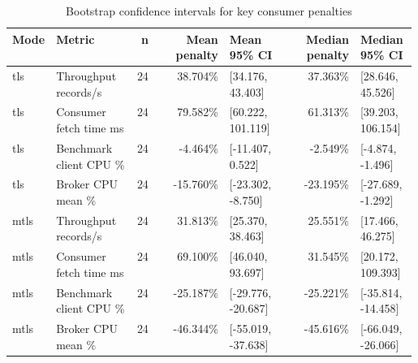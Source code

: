 \begin{table}[H]
\centering
\setlength{\tabcolsep}{4pt}
\renewcommand{\arraystretch}{1.15}
\begin{tabular}{|p{0.10\linewidth}|p{0.20\linewidth}|r|r|p{0.14\linewidth}|r|p{0.14\linewidth}|}
\hline
\textbf{Mode} & \textbf{Metric} & \textbf{n} & \textbf{Mean penalty} & \textbf{Mean 95\% CI} & \textbf{Median penalty} & \textbf{Median 95\% CI} \\
\hline
tls & Throughput records/s & 24 & 38.704\% & [34.176, 43.403] & 37.363\% & [28.646, 45.526] \\
tls & Consumer fetch time ms & 24 & 79.582\% & [60.222, 101.119] & 61.313\% & [39.203, 106.154] \\
tls & Benchmark client CPU \% & 24 & -4.464\% & [-11.407, 0.522] & -2.549\% & [-4.874, -1.496] \\
tls & Broker CPU mean \% & 24 & -15.760\% & [-23.302, -8.750] & -23.195\% & [-27.689, -1.292] \\
mtls & Throughput records/s & 24 & 31.813\% & [25.370, 38.463] & 25.551\% & [17.466, 46.275] \\
mtls & Consumer fetch time ms & 24 & 69.100\% & [46.040, 93.697] & 31.545\% & [20.172, 109.393] \\
mtls & Benchmark client CPU \% & 24 & -25.187\% & [-29.776, -20.687] & -25.221\% & [-35.814, -14.458] \\
mtls & Broker CPU mean \% & 24 & -46.344\% & [-55.019, -37.638] & -45.616\% & [-66.049, -26.066] \\
\hline
\end{tabular}
\caption{Bootstrap confidence intervals for key consumer penalties}
\label{tab:consumer-bootstrap-ci}
\end{table}
